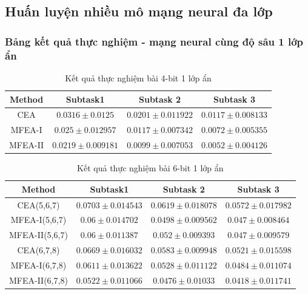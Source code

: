 
\subsection{Huấn luyện nhiều mô mạng neural đa lớp}
\subsubsection{Bảng kết quả thực nghiệm - mạng neural cùng độ sâu 1 lớp ẩn}

\begin{table} [H]
    \begin{center}
        \caption{Kết quả thực nghiệm bài 4-bit 1 lớp ẩn}

    \begin{tabular}{|c|c|c|c|}
    \hline
    \multirow{1}{*}{\textbf{Method}} & \multicolumn{1}{c|}{\textbf{Subtask1}} & \multicolumn{1}{c|}{\textbf{Subtask 2}} & \multicolumn{1}{c|}{\textbf{Subtask 3}} \\ \hline
    CEA & $0.0316 \pm 0.0125$ & $0.0201 \pm 0.011922$ & $0.0117 \pm 0.008133$ \\
    MFEA-I & $0.025 \pm 0.012957$ & $0.0117 \pm 0.007342$ & $0.0072 \pm 0.005355$\\
    MFEA-II  & $\mathbf{0.0219 \pm 0.009181}$ & $\mathbf{0.0099 \pm 0.007053}$ & $\mathbf{0.0052 \pm 0.004126}$ \\\hline
    
    \end{tabular}
    \end{center}
    
    \label{tab:result:nbit}
\end{table}
\begin{table} [H]   
    \begin{center}
        \caption{Kết quả thực nghiệm bài 6-bit 1 lớp ẩn}

    \begin{tabular}{|c|c|c|c|}
    \hline
    \multirow{1}{*}{\textbf{Method}} & \multicolumn{1}{c|}{\textbf{Subtask1}} & \multicolumn{1}{c|}{\textbf{Subtask 2}} & \multicolumn{1}{c|}{\textbf{Subtask 3}} \\ \hline
    CEA(5,6,7)  & $0.0703 \pm 0.014543$ & $0.0619 \pm 0.018078$ & $0.0572 \pm 0.017982$ \\
    MFEA-I(5,6,7)   & $\mathbf{0.06 \pm 0.014702}$ & $\mathbf{0.0498 \pm 0.009562}$ & $0.047 \pm 0.008464$ \\
    MFEA-II(5,6,7)  & $0.06 \pm 0.011387$ & $0.052 \pm 0.009393$ & $\mathbf{0.047 \pm 0.009579}$ \\\hline
    
    CEA(6,7,8)   & $0.0669 \pm 0.016032$ & $0.0583 \pm 0.009948$ & $0.0521 \pm 0.015598$ \\
    MFEA-I(6,7,8)  & $0.0611 \pm 0.013622$ & $0.0528 \pm 0.011122$ & $0.0484 \pm 0.011074$ \\
    MFEA-II(6,7,8) & $\mathbf{0.0522 \pm 0.011066}$ & $\mathbf{0.0476 \pm 0.01033}$ & $\mathbf{0.0418 \pm 0.011741}$ \\\hline
    
    \end{tabular}
    \end{center}
    \label{tab:result:nbit}
\end{table}    
